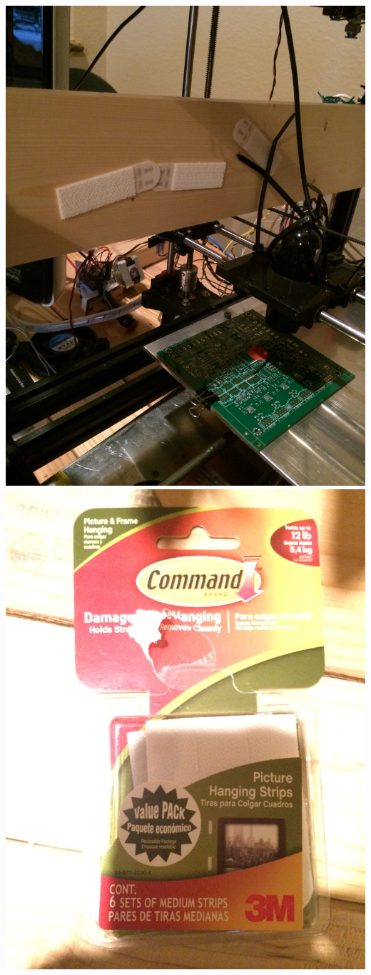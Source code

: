 \documentclass[12pt]{article}
\begin{document}
\includegraphics[scale=0.1,angle=270]{images/volume_analysis_setup/IMG_0612.JPG}
\includegraphics[scale=0.1,angle=270]{images/volume_analysis_setup/IMG_0613.JPG}
\end{document}
